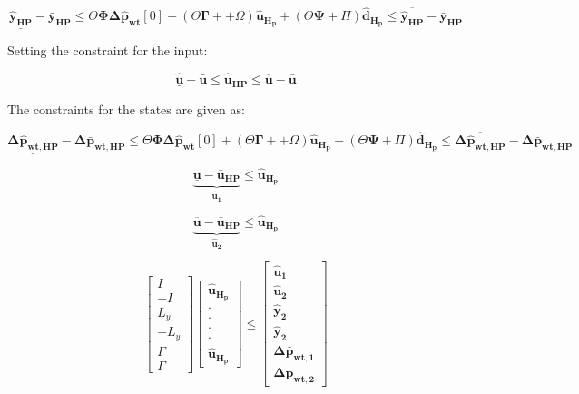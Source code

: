 \begin{equation}
	\underline{\bm{\hat{y}_{HP}}} - \bm{\bar{y}_{HP}} \leq \Theta \bm{\Phi} \bm{\Delta \hat{p}_{wt}}[0] +  (\Theta \bm{\Gamma}+ + \Omega) \bm{\hat{u}_{H_p}} + (\Theta \bm{\Psi} + \Pi)  \bm{\hat{d}_{H_p}} \leq \overline{\bm{\hat{y}_{HP}}} - \bm{\bar{y}_{HP}}
\end{equation}

Setting the constraint for the input:

\begin{equation}
\underline{\bm{\hat{u}}} - \bm{\bar{u}} \leq \bm{\hat{u}_{HP}} \leq \overline{\bm{{u}}} - \bm{\bar{u}}
\end{equation}

The constraints for the states are given as:

\begin{equation}
	\underline{\bm{\Delta \hat{p}_{wt,HP}}} - \bm{\Delta \bar{p}_{wt,HP}} \leq \Theta \bm{\Phi} \bm{\Delta \hat{p}_{wt}}[0] +  (\Theta \bm{\Gamma}+ + \Omega) \bm{\hat{u}_{H_p}} + (\Theta \bm{\Psi} + \Pi)  \bm{\hat{d}_{H_p}} \leq \overline{\bm{\Delta \hat{p}_{wt,HP}}} - \bm{\Delta \bar{p}_{wt,HP}} 
\end{equation}

\begin{equation}
\underbrace{\underline{\bm{u}} - \bm{\bar{u}_{HP}}}_{\bm{\hat{u}_{1}}} \leq \bm{\hat{u}_{H_p}}
\end{equation}

\begin{equation}
	\underbrace{\overline{\bm{{u}}} - \bm{\bar{u}_{HP}}}_{\bm{\hat{u}_{2}}} \leq \bm{\hat{u}_{H_p}}
\end{equation}


\begin{equation}
	\begin{bmatrix}
		I 	\\
		-I 	\\
		L_{y}	\\
		-L_{y}	\\
		\Gamma	\\
		\Gamma
	\end{bmatrix}
	\begin{bmatrix}
			\bm{\hat{u}_{H_p}}	\\
			\cdot 		\\
			\cdot 		\\
			\cdot 		\\
			\cdot 		\\
			\bm{\hat{u}_{H_p}}
	\end{bmatrix}
	\leq 
	\begin{bmatrix}
			\bm{\hat{u}_{1}}	\\
			\bm{\hat{u}_{2}}	\\
			\bm{\hat{y}_{2}}	\\
			\bm{\hat{y}_{2}}	\\
			\bm{\Delta \bar{p}_{wt,1}}	\\
			\bm{\Delta \bar{p}_{wt,2}}	
	\end{bmatrix}
\end{equation}





